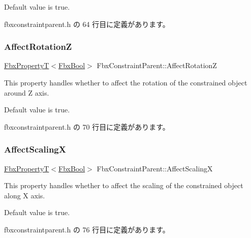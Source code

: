 Default value is true. 

 fbxconstraintparent.\+h の 64 行目に定義があります。

\mbox{\label{class_fbx_constraint_parent_a2b6447babd670eb5023143d1773cdaf8}} 
\subsubsection{\texorpdfstring{Affect\+RotationZ}{AffectRotationZ}}
{\footnotesize\ttfamily \hyperlink{class_fbx_property_t}{Fbx\+PropertyT}$<$\hyperlink{fbxtypes_8h_a92e0562b2fe33e76a242f498b362262e}{Fbx\+Bool}$>$ Fbx\+Constraint\+Parent\+::\+Affect\+RotationZ}

This property handles whether to affect the rotation of the constrained object around Z axis.

Default value is true. 

 fbxconstraintparent.\+h の 70 行目に定義があります。

\mbox{\label{class_fbx_constraint_parent_ab4f8c487608b32feff9804c7e70e851e}} 
\subsubsection{\texorpdfstring{Affect\+ScalingX}{AffectScalingX}}
{\footnotesize\ttfamily \hyperlink{class_fbx_property_t}{Fbx\+PropertyT}$<$\hyperlink{fbxtypes_8h_a92e0562b2fe33e76a242f498b362262e}{Fbx\+Bool}$>$ Fbx\+Constraint\+Parent\+::\+Affect\+ScalingX}

This property handles whether to affect the scaling of the constrained object along X axis.

Default value is true. 

 fbxconstraintparent.\+h の 76 行目に定義があります。

\mbox{\label{class_fbx_constraint_parent_a32b210fd27c0e55456741428987755fe}} 
